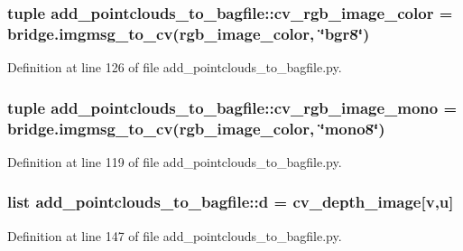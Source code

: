 \subsubsection[{cv\-\_\-rgb\-\_\-image\-\_\-color}]{\setlength{\rightskip}{0pt plus 5cm}tuple {\bf add\-\_\-pointclouds\-\_\-to\-\_\-bagfile\-::cv\-\_\-rgb\-\_\-image\-\_\-color} = bridge.\-imgmsg\-\_\-to\-\_\-cv({\bf rgb\-\_\-image\-\_\-color}, \char`\"{}bgr8\char`\"{})}\label{namespaceadd__pointclouds__to__bagfile_af3656521d70fbd3204a6eded3944a67d}


\-Definition at line 126 of file add\-\_\-pointclouds\-\_\-to\-\_\-bagfile.\-py.

\subsubsection[{cv\-\_\-rgb\-\_\-image\-\_\-mono}]{\setlength{\rightskip}{0pt plus 5cm}tuple {\bf add\-\_\-pointclouds\-\_\-to\-\_\-bagfile\-::cv\-\_\-rgb\-\_\-image\-\_\-mono} = bridge.\-imgmsg\-\_\-to\-\_\-cv({\bf rgb\-\_\-image\-\_\-color}, \char`\"{}mono8\char`\"{})}\label{namespaceadd__pointclouds__to__bagfile_a2403828e6736ac15f6a1d254711fa07f}


\-Definition at line 119 of file add\-\_\-pointclouds\-\_\-to\-\_\-bagfile.\-py.

\subsubsection[{d}]{\setlength{\rightskip}{0pt plus 5cm}list {\bf add\-\_\-pointclouds\-\_\-to\-\_\-bagfile\-::d} = {\bf cv\-\_\-depth\-\_\-image}[v,u]}\label{namespaceadd__pointclouds__to__bagfile_a22296cd9d798629de5d35da0bbdb7ee1}


\-Definition at line 147 of file add\-\_\-pointclouds\-\_\-to\-\_\-bagfile.\-py.

